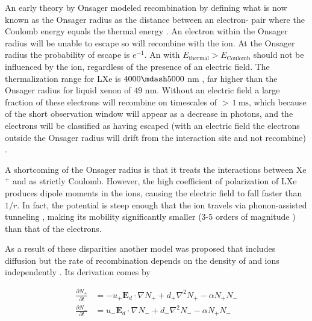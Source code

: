 An early theory by Onsager modeled recombination by defining what is now known as the Onsager radius as the distance between an
electron- pair where the Coulomb energy equals the \electron thermal energy .  An electron within the
Onsager radius will be unable to escape so will recombine with the ion.  At the Onsager radius the probability of escape is $e^{-1}$.  An
\electron
with $E_{\mathrm{thermal}} > E_{\mathrm{Coulomb}}$ should not be influenced by the ion, regardless of the presence of an electric
field.  The thermalization range for LXe is $4000 \mdash 5000$ nm , far higher than the Onsager radius for liquid
xenon of $49$ nm.  Without an electric field a large fraction of these electrons will recombine on
timescales of ${>}\, 1\ \mathrm{ms}$, which because of the short observation window will appear as a decrease in photons, and the electrons
will be classified as having escaped (with an electric field the electrons outside the Onsager radius will drift from the interaction site
and not recombine) .

A shortcoming of the Onsager radius is that it treats the interactions between Xe$^{+}$ and \electron as strictly Coulomb.  However,
the high coefficient of polarization of LXe produces dipole moments in the ions, causing the electric field to fall faster than
$1/r$.  In fact, the potential is steep enough that the ion travels via phonon-assisted tunneling , making its
mobility significantly smaller (3-5 orders of magnitude ) than that of the electrons.

As a result of these disparities another model was proposed that includes diffusion but the rate of
recombination depends on
the density of \electron and ions independently .  Its derivation comes by

\vspace{-15pt}

\begin{subequations}
\begin{align}
\frac{\partial N_{+}}{\partial t} &= -u_{+} \mathbf{E}_d \cdot \nabla N_{+} + d_{+} \nabla^{2} N_{+} - \alpha N_{+} N_{-}
\label{eq:diff_plus} \\
\frac{\partial N_{-}}{\partial t} &= u_{-} \mathbf{E}_d \cdot \nabla N_{-} + d_{-} \nabla^{2} N_{-} - \alpha N_{+} N_{-}
\label{eq:diff_minus}
\end{align}
\label{eq:diff_plus_mins}
\end{subequations}

